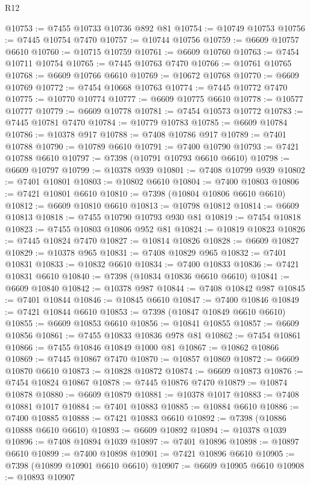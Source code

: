 \begin{lexlean}{R12}
\begin{coremodule}
{{{{{{{{{{{{{{{{{{{{{{{{{{{{{{{{{{{{{{{{{{{{{{{{{{{{{{{{{{{{{{{{{{{{{{{{{{{{{{{{{{@10753 := @7455 @10733 @10736 @892 @81
@10754 := @10749 @10753
@10756 := @7445 @10754 @7470
@10757 := @10744 @10756
@10759 := @6609 @10757 @6610
@10760 := @10715 @10759
@10761 := @6609 @10760
@10763 := @7454 @10711 @10754
@10765 := @7445 @10763 @7470
@10766 := @10761 @10765
@10768 := @6609 @10766 @6610
@10769 := @10672 @10768
@10770 := @6609 @10769
@10772 := @7454 @10668 @10763
@10774 := @7445 @10772 @7470
@10775 := @10770 @10774
@10777 := @6609 @10775 @6610
@10778 := @10577 @10777
@10779 := @6609 @10778
@10781 := @7454 @10573 @10772
@10783 := @7445 @10781 @7470
@10784 := @10779 @10783
@10785 := @6609 @10784
@10786 := @10378 @917
@10788 := @7408 @10786 @917
@10789 := @7401 @10788
@10790 := @10789 @6610
@10791 := @7400 @10790
@10793 := @7421 @10788 @6610
@10797 := @7398 (@10791 @10793 @6610 @6610)
@10798 := @6609 @10797
@10799 := @10378 @939
@10801 := @7408 @10799 @939
@10802 := @7401 @10801
@10803 := @10802 @6610
@10804 := @7400 @10803
@10806 := @7421 @10801 @6610
@10810 := @7398 (@10804 @10806 @6610 @6610)
@10812 := @6609 @10810 @6610
@10813 := @10798 @10812
@10814 := @6609 @10813
@10818 := @7455 @10790 @10793 @930 @81
@10819 := @7454 @10818
@10823 := @7455 @10803 @10806 @952 @81
@10824 := @10819 @10823
@10826 := @7445 @10824 @7470
@10827 := @10814 @10826
@10828 := @6609 @10827
@10829 := @10378 @965
@10831 := @7408 @10829 @965
@10832 := @7401 @10831
@10833 := @10832 @6610
@10834 := @7400 @10833
@10836 := @7421 @10831 @6610
@10840 := @7398 (@10834 @10836 @6610 @6610)
@10841 := @6609 @10840
@10842 := @10378 @987
@10844 := @7408 @10842 @987
@10845 := @7401 @10844
@10846 := @10845 @6610
@10847 := @7400 @10846
@10849 := @7421 @10844 @6610
@10853 := @7398 (@10847 @10849 @6610 @6610)
@10855 := @6609 @10853 @6610
@10856 := @10841 @10855
@10857 := @6609 @10856
@10861 := @7455 @10833 @10836 @978 @81
@10862 := @7454 @10861
@10866 := @7455 @10846 @10849 @1000 @81
@10867 := @10862 @10866
@10869 := @7445 @10867 @7470
@10870 := @10857 @10869
@10872 := @6609 @10870 @6610
@10873 := @10828 @10872
@10874 := @6609 @10873
@10876 := @7454 @10824 @10867
@10878 := @7445 @10876 @7470
@10879 := @10874 @10878
@10880 := @6609 @10879
@10881 := @10378 @1017
@10883 := @7408 @10881 @1017
@10884 := @7401 @10883
@10885 := @10884 @6610
@10886 := @7400 @10885
@10888 := @7421 @10883 @6610
@10892 := @7398 (@10886 @10888 @6610 @6610)
@10893 := @6609 @10892
@10894 := @10378 @1039
@10896 := @7408 @10894 @1039
@10897 := @7401 @10896
@10898 := @10897 @6610
@10899 := @7400 @10898
@10901 := @7421 @10896 @6610
@10905 := @7398 (@10899 @10901 @6610 @6610)
@10907 := @6609 @10905 @6610
@10908 := @10893 @10907
}}}}}}}}}}}}}}}}}}}}}}}}}}}}}}}}}}}}}}}}}}}}}}}}}}}}}}}}}}}}}}}}}}}}}}}}}}}}}}}}}}
\end{coremodule}
\end{lexlean}
